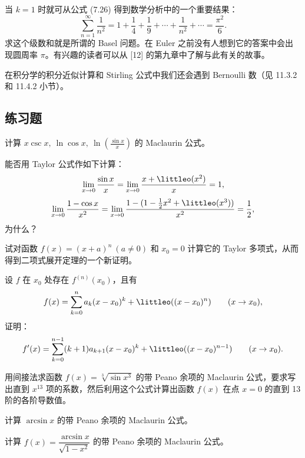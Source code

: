 当 $k=1$ 时就可从公式 (7.26) 得到数学分析中的一个重要结果：
\[
  \sum_{n=1}^{\infty}\frac{1}{n^2}=1+\frac14+\frac19+\cdots+\frac{1}{n^2}+\cdots=\frac{\pi^2}{6}.
\]
求这个级数和就是所谓的 Basel 问题。在 Euler 之前没有人想到它的答案中会出现圆周率 $\pi$。有兴趣的读者可以从 [12] 的第九章中了解与此有关的故事。

在积分学的积分近似计算和 Stirling 公式中我们还会遇到 Bernoulli 数（见 11.3.2 和 11.4.2 小节）。

\subsection{练习题}

\begin{xexercise}[1]
计算 $x\csc x,\ \ln\cos x,\ \ln\left(\frac{\sin x}{x}\right)$ 的 Maclaurin 公式。
\end{xexercise}

\begin{xexercise}[2]
能否用 Taylor 公式作如下计算：
\[
  \lim_{x\to0}\frac{\sin x}{x}
  =\lim_{x\to0}\frac{x+\littleo(x^2)}{x}=1,
\]
\[
  \lim_{x\to0}\frac{1-\cos x}{x^2}
  =\lim_{x\to0}\frac{1-(1-\frac12x^2+\littleo(x^3))}{x^2}=\frac12,
\]
为什么？
\end{xexercise}

\begin{xexercise}[3]
试对函数 $f(x)=(x+a)^n\ (a\neq0)$ 和 $x_0=0$ 计算它的 Taylor 多项式，从而得到二项式展开定理的一个新证明。
\end{xexercise}

\begin{xexercise}[4]
设 $f$ 在 $x_0$ 处存在 $f^{(n)}(x_0)$，且有
\[
  f(x)=\sum_{k=0}^n a_k(x-x_0)^k+\littleo((x-x_0)^n)\qquad(x\to x_0),
\]
证明：
\[
  f'(x)=\sum_{k=0}^{n-1}(k+1)a_{k+1}(x-x_0)^k+\littleo((x-x_0)^{n-1})\qquad(x\to x_0).
\]
\end{xexercise}

\begin{xexercise}[5]
用间接法求函数 $f(x)=\sqrt[3]{\sin x^3}$ 的带 Peano 余项的 Maclaurin 公式，要求写出直到 $x^{13}$ 项的系数，然后利用这个公式计算出函数 $f(x)$ 在点 $x=0$ 的直到 13 阶的各阶导数值。
\end{xexercise}

\begin{xexercise}[6]
计算 $\arcsin x$ 的带 Peano 余项的 Maclaurin 公式。
\end{xexercise}

\begin{xexercise}[7]
计算 $f(x)=\dfrac{\arcsin x}{\sqrt{1-x^2}}$ 的带 Peano 余项的 Maclaurin 公式。
\end{xexercise}

